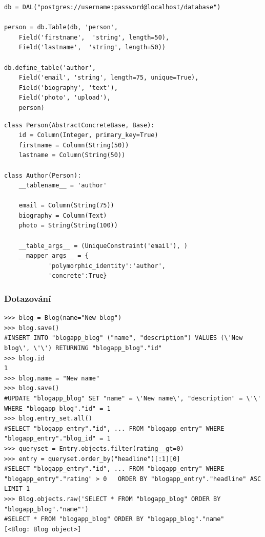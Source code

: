\documentclass[ing,male,java,dept456]{diploma}						%
\begin{document}
\begin{lstlisting}[style=custompython, label=src:light-w2p-mapping, caption=Ukázka mapování ve web2py DBAL]
db = DAL("postgres://username:password@localhost/database")

person = db.Table(db, 'person',
    Field('firstname',  'string', length=50),
    Field('lastname',  'string', length=50))

db.define_table('author', 
    Field('email', 'string', length=75, unique=True), 
    Field('biography', 'text'),
    Field('photo', 'upload'),
    person)
\end{lstlisting}

\begin{lstlisting}[style=custompython, label=src:light-sqla-mapping, caption={Ukázka mapování v SQLAlchemy}]
class Person(AbstractConcreteBase, Base):
    id = Column(Integer, primary_key=True)
    firstname = Column(String(50))
    lastname = Column(String(50))

class Author(Person):
    __tablename__ = 'author'

    email = Column(String(75))
    biography = Column(Text)
    photo = String(String(100))

    __table_args__ = (UniqueConstraint('email'), )
    __mapper_args__ = {
			'polymorphic_identity':'author',
			'concrete':True}
\end{lstlisting}
\clearpage

\subsubsection{Dotazování}
\label{subsubsec:Query}
\begin{lstlisting}[style=custompython, label=src:dj-query, caption={Ukázka práce s daty v Django ORM}]
>>> blog = Blog(name="New blog")
>>> blog.save()
#INSERT INTO "blogapp_blog" ("name", "description") VALUES (\'New blog\', \'\') RETURNING "blogapp_blog"."id"
>>> blog.id
1
>>> blog.name = "New name"
>>> blog.save()
#UPDATE "blogapp_blog" SET "name" = \'New name\', "description" = \'\' WHERE "blogapp_blog"."id" = 1 
>>> blog.entry_set.all()
#SELECT "blogapp_entry"."id", ... FROM "blogapp_entry" WHERE "blogapp_entry"."blog_id" = 1
>>> queryset = Entry.objects.filter(rating__gt=0)
>>> entry = queryset.order_by("headline")[:1][0]
#SELECT "blogapp_entry"."id", ... FROM "blogapp_entry" WHERE "blogapp_entry"."rating" > 0   ORDER BY "blogapp_entry"."headline" ASC LIMIT 1
>>> Blog.objects.raw('SELECT * FROM "blogapp_blog" ORDER BY "blogapp_blog"."name"')
#SELECT * FROM "blogapp_blog" ORDER BY "blogapp_blog"."name"
[<Blog: Blog object>]
\end{lstlisting}
\end{document}
